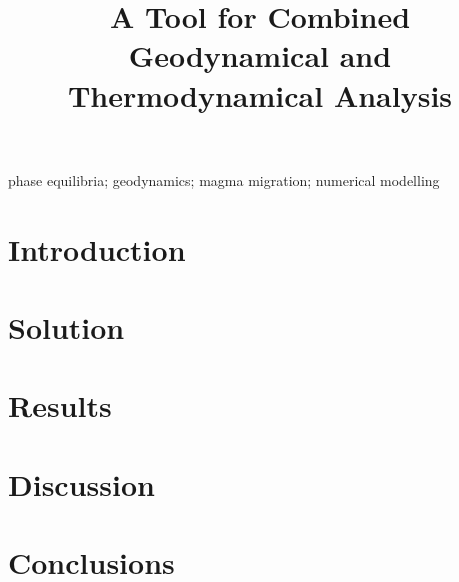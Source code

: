 \documentclass[a4paper]{article}
\title{A Tool for Combined Geodynamical and Thermodynamical Analysis}
\date{}
\begin{document}
\maketitle

\begin{abstract}

\end{abstract}

\begin{keywords}
phase equilibria; geodynamics; magma migration; numerical modelling
\end{keywords}

\section{Introduction}
\label{sec:introduction}


\section{Solution}
\label{sec:solution}


\section{Results}
\label{sec:results}


\section{Discussion}
\label{sec:discussion}


\section{Conclusions}
\label{sec:conclusions}


\printbibliography
\end{document}
